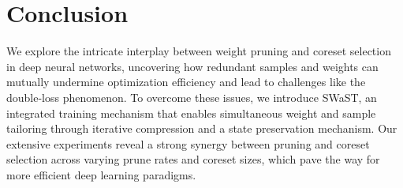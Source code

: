 \section{Conclusion}
We explore the intricate interplay between weight pruning and coreset selection in deep neural networks, uncovering how redundant samples and weights can mutually undermine optimization efficiency and lead to challenges like the double-loss phenomenon. To overcome these issues, we introduce SWaST, an integrated training mechanism that enables simultaneous weight and sample tailoring through iterative compression and a state preservation mechanism.
Our extensive experiments reveal a strong synergy between pruning and coreset selection across varying prune rates and coreset sizes, which pave the way for more efficient deep learning paradigms.
